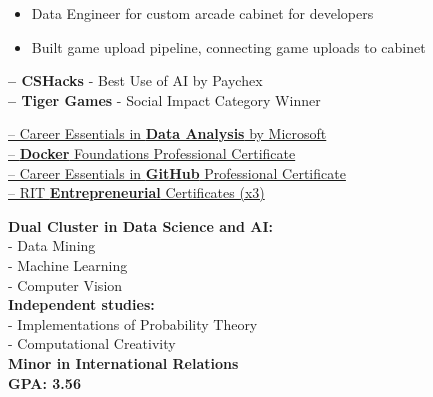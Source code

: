 \documentclass[10pt,a4paper,ragged2e,withhyper]{altacv}
\begin{document}
\begin{paracol}{2}
\divider

\begin{itemize}
    \item Data Engineer for custom arcade cabinet for developers
    \item Built game upload pipeline, connecting game uploads to cabinet
\end{itemize}\par



\textbf{ -- CSHacks} - Best Use of AI by Paychex\\
\textbf{ -- Tiger Games} - Social Impact Category Winner\\

\divider

\href{https://www.linkedin.com/learning/certificates/2cb69378c606fec5a6f3a107b99a896862db392b7a3692f71a6b53af5d5545c5}{ -- Career Essentials in \textbf{Data Analysis} by Microsoft}\\
\href{https://www.linkedin.com/learning/certificates/7b952323152e258ca468c33ddc9ebcf3c55036f58a5cfb3fb9c1410da655aaa5}{ -- \textbf{Docker} Foundations Professional Certificate}\\
\href{https://www.linkedin.com/learning/certificates/7facc28a13405134b3b7fa785303e9b1cf697f32d67f759e89960fbdc8a044d9}{ -- Career Essentials in \textbf{GitHub} Professional Certificate}\\
\href{https://rit.edu/simonecenter}{ -- RIT \textbf{Entrepreneurial} Certificates (x3)}\\

\switchcolumn


\textbf{Dual Cluster in Data Science and AI:}\\
 - Data Mining\\
 - Machine Learning\\
 - Computer Vision\\
\textbf{Independent studies:\\}
 - Implementations of Probability Theory\\
 - Computational Creativity\\
\textbf{Minor in International Relations}\\
\textbf{GPA: 3.56}\\


\end{paracol}
\end{document}
